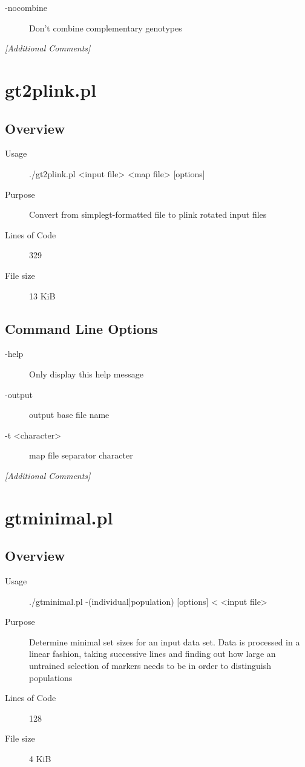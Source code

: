 \begin{description}
\item[-nocombine] Don't combine complementary genotypes
\end{description}

\emph{[Additional Comments]}

\section{gt2plink.pl}
\label{sec:gt2plink.pl}

\subsection{Overview}
\label{sec:gt2plink.pl-overview}

\begin{description}
\item[Usage] ./gt2plink.pl <input file> <map file> [options]
\item[Purpose] Convert from simplegt-formatted file to plink rotated input files
\item[Lines of Code] 329
\item[File size] 13 KiB
\end{description}

\subsection{Command Line Options}
\label{sec:gt2plink.pl-command-line}

\begin{description}
\item[-help] Only display this help message
\item[-output] output base file name
\item[-t <character>] map file separator character
\end{description}

\emph{[Additional Comments]}

\section{gtminimal.pl}
\label{sec:gtminimal.pl}

\subsection{Overview}
\label{sec:gtminimal.pl-overview}

\begin{description}
\item[Usage] ./gtminimal.pl -(individual|population) [options] < <input file>
\item[Purpose] Determine minimal set sizes for an input data set. Data is processed in a linear fashion, taking successive lines and finding out how large an untrained selection of markers needs to be in order to distinguish populations
\item[Lines of Code] 128
\item[File size] 4 KiB
\end{description}

